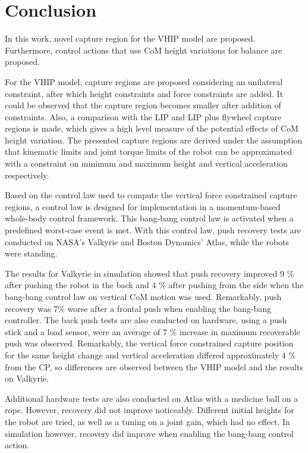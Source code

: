 %
\chapter{Conclusion}\label{chap:conclusion}
In this work, novel capture region for the \ac{VHIP} model are proposed. Furthermore, control actions that use \ac{CoM} height variations for balance are proposed. 

For the \ac{VHIP} model, capture regions are proposed considering an unilateral constraint, after which height constraints and force constraints are added. It could be observed that the capture region becomes smaller after addition of constraints. Also, a comparison with the \ac{LIP} and \ac{LIP} plus flywheel capture regions is made, which gives a high level measure of the potential effects of \ac{CoM} height variation. The presented capture regions are derived under the assumption that kinematic limits and joint torque limits of the robot can be approximated with a constraint on minimum and maximum height and vertical acceleration respectively.

Based on the control law used to compute the vertical force constrained capture regions, a control law is designed for implementation in a momentum-based whole-body control framework. This bang-bang control law is activated when a predefined worst-case event is met. With this control law, push recovery tests are conducted on NASA's Valkyrie and Boston Dynamics' Atlas, while the robots were standing. 

The results for Valkyrie in simulation showed that push recovery improved $9$ \% after pushing the robot in the back and $4$ \% after pushing from the side when the bang-bang control law on vertical \ac{CoM} motion was used. Remarkably, push recovery was $7$\% worse after a frontal push when enabling the bang-bang controller. The back push tests are also conducted on hardware, using a push stick and a load sensor, were an average of $7$ \% increase in maximum recoverable push was observed. Remarkably, the vertical force constrained capture position for the same height change and vertical acceleration differed approximately $4$ \% from the \ac{CP}, so differences are observed between the \ac{VHIP} model and the results on Valkyrie.

Additional hardware tests are also conducted on Atlas with a medicine ball on a rope. However, recovery did not improve noticeably. Different initial heights for the robot are tried, as well as a tuning on a joint gain, which had no effect. In simulation however, recovery did improve when enabling the bang-bang control action.


